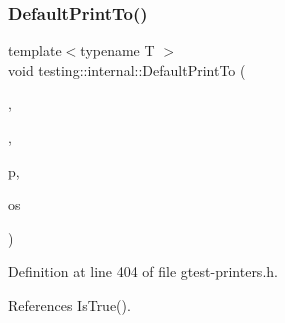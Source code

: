 \subsubsection{\texorpdfstring{Default\+Print\+To()}{DefaultPrintTo()}\hspace{0.1cm}{\footnotesize\ttfamily [2/3]}}
{\footnotesize\ttfamily template$<$typename T $>$ \\
void testing\+::internal\+::\+Default\+Print\+To (\begin{DoxyParamCaption}\item[{\hyperlink{namespacetesting_1_1internal_abf080521ce135deb510e0a7830fd3d33}{Is\+Not\+Container}}]{,  }\item[{\hyperlink{namespacetesting_1_1internal_a62f917c3424d8841de9b49b5ec28edb4}{true\+\_\+type}}]{,  }\item[{T $\ast$}]{p,  }\item[{\+::std\+::ostream $\ast$}]{os }\end{DoxyParamCaption})}



Definition at line 404 of file gtest-\/printers.\+h.



References Is\+True().


